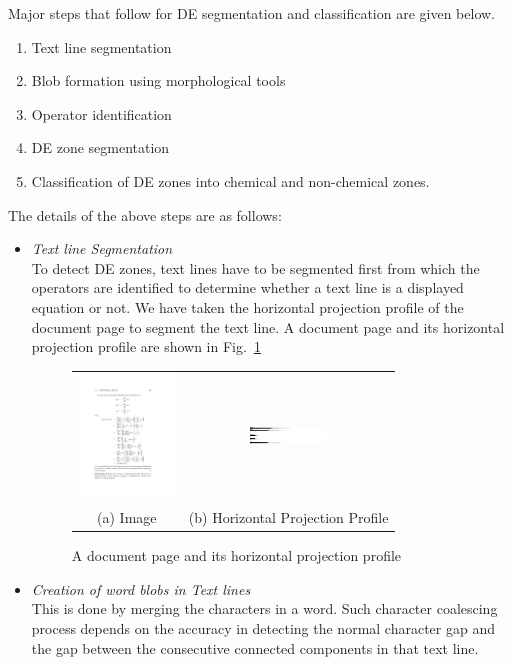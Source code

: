 \documentclass[12pt]{IEEEtran}
\begin{document}
Major steps that follow for DE segmentation and classification are given below.
\begin{enumerate}
 \item Text line segmentation
 \item Blob formation using morphological tools
 \item Operator identification
 \item DE zone segmentation
 \item Classification of DE zones into chemical and non-chemical zones.
\end{enumerate}
The details of the above steps are as follows:
\begin{itemize}
 \item[1.] {\em Text line Segmentation}\\
 To detect DE zones, text lines have to be segmented first from which the operators are identified to 
 determine whether a text line is a displayed equation or not. We have taken the horizontal projection
 profile of the document page to segment the text line. A document page and its horizontal projection 
 profile are shown in Fig.~\ref{hproj}
 \begin{figure}[h]\center\footnotesize

\begin{tabular}{|c|c|}\hline
 \includegraphics[width=1.0in, height=1.3in]{org.png} &
 \includegraphics[width=0.8in, height=1.3in]{hProj.png} \\ 
 (a) Image &(b) Horizontal Projection Profile
 \\\hline
 \end{tabular}
 \caption{A document page and its horizontal projection profile}
 \label{hproj}
\end{figure}
 
 
 \item[2.] {\em Creation of word blobs in Text lines}\\
 This is done by merging the characters in a word. Such character coalescing process depends on the accuracy in detecting the normal
character gap and the gap between the consecutive connected components in that text line.


\end{itemize}
\end{document}
